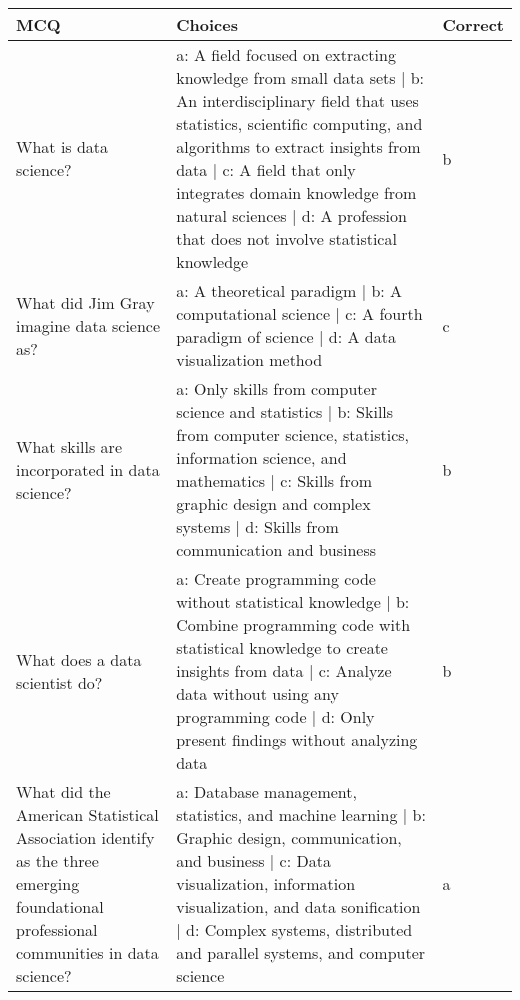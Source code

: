 \begin{tabular}{lll}
\toprule
MCQ & Choices & Correct \\
\midrule
What is data science? & a: A field focused on extracting knowledge from small data sets | b: An interdisciplinary field that uses statistics, scientific computing, and algorithms to extract insights from data | c: A field that only integrates domain knowledge from natural sciences | d: A profession that does not involve statistical knowledge & b \\
What did Jim Gray imagine data science as? & a: A theoretical paradigm | b: A computational science | c: A fourth paradigm of science | d: A data visualization method & c \\
What skills are incorporated in data science? & a: Only skills from computer science and statistics | b: Skills from computer science, statistics, information science, and mathematics | c: Skills from graphic design and complex systems | d: Skills from communication and business & b \\
What does a data scientist do? & a: Create programming code without statistical knowledge | b: Combine programming code with statistical knowledge to create insights from data | c: Analyze data without using any programming code | d: Only present findings without analyzing data & b \\
What did the American Statistical Association identify as the three emerging foundational professional communities in data science? & a: Database management, statistics, and machine learning | b: Graphic design, communication, and business | c: Data visualization, information visualization, and data sonification | d: Complex systems, distributed and parallel systems, and computer science & a \\
\bottomrule
\end{tabular}
